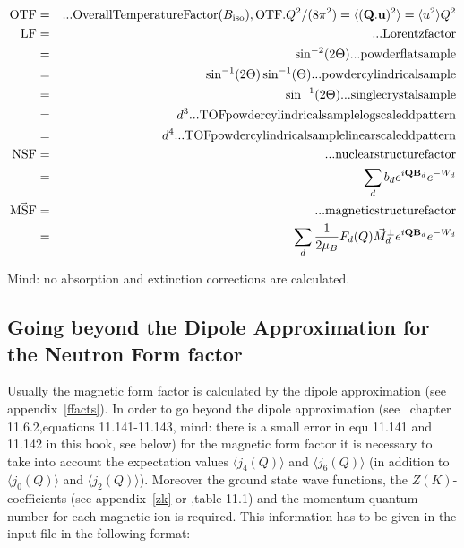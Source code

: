 \begin{eqnarray}
{\rm OTF}&=& {\rm ... Overall Temperature Factor (}B_{\rm iso}),{\rm  OTF}.Q^2/(8\pi^2) =\langle (\mbf Q.\mbf %
u)^2 \rangle = \langle u^2 \rangle Q^2  \\
{\rm LF} &=& {\rm ... Lorentzfactor}  \\
              & =& \sin^{-2}(2\Theta){\rm ... powder flat sample}\\
              & =& \sin^{-1}(2\Theta)\sin^{-1}(\Theta){\rm ... powder cylindrical sample}\\
              & =& \sin^{-1}(2\Theta){\rm ...single crystal sample}\\
             & =& d^3 {\rm ... TOF powder cylindrical sample log scaled d pattern}\\
             & =& d^4 {\rm... TOF powder cylindrical sample linear scaled d pattern}\\
{\rm NSF} &=&{\rm ... nuclear structure factor}\\
                 &=&  \sum_{d} \bar b_d e^{i\mbf Q \mbf B_d} e^{-W_d}\\
\vec{\rm MSF} &=&{\rm ... magnetic structure factor}\\
                &=& \sum_{d}\frac{1}{2\mu_B}F_d(Q) \vec M^{\perp}_{d} e^{i\mbf Q\mbf B_d} e^{-W_d} 
\end{eqnarray}

Mind: no absorption and extinction corrections are calculated.


\subsection{Going beyond the Dipole Approximation for the Neutron Form factor}\label{mcdiff_gobeyond}

Usually the magnetic form factor is calculated by the dipole approximation (see appendix~\ref{ffacts}).
In order to go beyond the dipole approximation (see~\cite{lovesey84-1} chapter 11.6.2,equations 
11.141-11.143, mind: there is a small error in equ 11.141 and 11.142 in this book, see below) for the 
magnetic form factor it is necessary to take into account the expectation values
$\langle j_4(Q) \rangle$ and $\langle j_6(Q) \rangle$ 
(in addition to $\langle j_0(Q) \rangle$ and $\langle j_2(Q) \rangle$). 
Moreover the ground state wave functions, the $Z(K)$-coefficients (see appendix~\ref{zk}
or \cite{lovesey84-1},table 11.1)
and the momentum quantum number for each magnetic ion is required. This
information has to be given in the input file 
in the following format:

